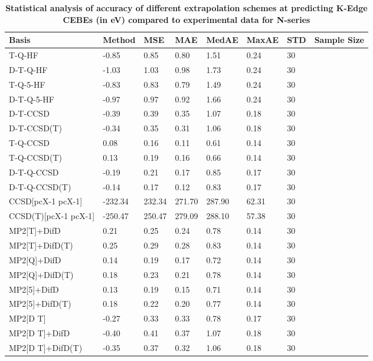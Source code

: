 \begin{table}
  \caption{\textbf{Statistical analysis of accuracy of different extrapolation schemes at predicting K-Edge CEBEs (in eV) compared to experimental data for N-series}}
  \label{tbl:extrap-scheme-summary-n}
  \begin{tabular}{l l l l l l l l }
    \toprule
    \textbf{Basis} & \textbf{Method} & \textbf{MSE} & \textbf{MAE} & \textbf{MedAE} & \textbf{MaxAE} & \textbf{STD} & \textbf{Sample Size} \\ 
    \midrule
    T-Q-HF & -0.85 & 0.85 & 0.80 & 1.51 & 0.24 & 30 \\ 
    D-T-Q-HF & -1.03 & 1.03 & 0.98 & 1.73 & 0.24 & 30 \\ 
    T-Q-5-HF & -0.83 & 0.83 & 0.79 & 1.49 & 0.24 & 30 \\ 
    D-T-Q-5-HF & -0.97 & 0.97 & 0.92 & 1.66 & 0.24 & 30 \\ 
    D-T-CCSD & -0.39 & 0.39 & 0.35 & 1.07 & 0.18 & 30 \\ 
    D-T-CCSD(T) & -0.34 & 0.35 & 0.31 & 1.06 & 0.18 & 30 \\ 
    T-Q-CCSD & 0.08 & 0.16 & 0.11 & 0.61 & 0.14 & 30 \\ 
    T-Q-CCSD(T) & 0.13 & 0.19 & 0.16 & 0.66 & 0.14 & 30 \\ 
    D-T-Q-CCSD & -0.19 & 0.21 & 0.17 & 0.85 & 0.17 & 30 \\ 
    D-T-Q-CCSD(T) & -0.14 & 0.17 & 0.12 & 0.83 & 0.17 & 30 \\ 
    CCSD[pcX-1 pcX-1] & -232.34 & 232.34 & 271.70 & 287.90 & 62.31 & 30 \\ 
    CCSD(T)[pcX-1 pcX-1] & -250.47 & 250.47 & 279.09 & 288.10 & 57.38 & 30 \\ 
    MP2[T]+DifD & 0.21 & 0.25 & 0.24 & 0.78 & 0.14 & 30 \\ 
    MP2[T]+DifD(T) & 0.25 & 0.29 & 0.28 & 0.83 & 0.14 & 30 \\ 
    MP2[Q]+DifD & 0.14 & 0.19 & 0.17 & 0.72 & 0.14 & 30 \\ 
    MP2[Q]+DifD(T) & 0.18 & 0.23 & 0.21 & 0.78 & 0.14 & 30 \\ 
    MP2[5]+DifD & 0.13 & 0.19 & 0.15 & 0.71 & 0.14 & 30 \\ 
    MP2[5]+DifD(T) & 0.18 & 0.22 & 0.20 & 0.77 & 0.14 & 30 \\ 
    MP2[D T] & -0.27 & 0.33 & 0.33 & 0.78 & 0.17 & 30 \\ 
    MP2[D T]+DifD & -0.40 & 0.41 & 0.37 & 1.07 & 0.18 & 30 \\ 
    MP2[D T]+DifD(T) & -0.35 & 0.37 & 0.32 & 1.06 & 0.18 & 30 \\ 

\end{tabular}
\end{table}
